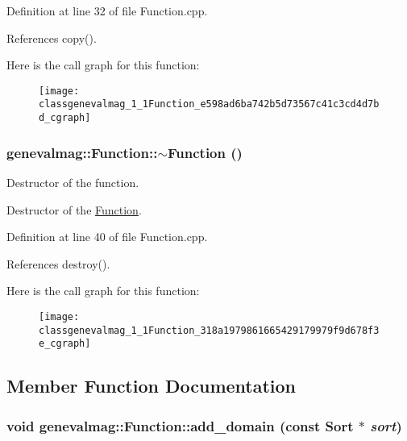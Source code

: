 Definition at line 32 of file Function.cpp.

References copy().

Here is the call graph for this function:\nopagebreak
\begin{figure}[H]
\begin{center}
\leavevmode
\texttt{[image: classgenevalmag\_1\_1Function\_e598ad6ba742b5d73567c41c3cd4d7bd\_cgraph]}
\end{center}
\end{figure}
\hypertarget{classgenevalmag_1_1Function_318a1979861665429179979f9d678f3e}{
\subsubsection[{$\sim$Function}]{\setlength{\rightskip}{0pt plus 5cm}genevalmag::Function::$\sim$Function ()}}
\label{classgenevalmag_1_1Function_318a1979861665429179979f9d678f3e}


Destructor of the function.

Destructor of the \hyperlink{classgenevalmag_1_1Function}{Function}. 

Definition at line 40 of file Function.cpp.

References destroy().

Here is the call graph for this function:\nopagebreak
\begin{figure}[H]
\begin{center}
\leavevmode
\texttt{[image: classgenevalmag\_1\_1Function\_318a1979861665429179979f9d678f3e\_cgraph]}
\end{center}
\end{figure}


\subsection{Member Function Documentation}
\hypertarget{classgenevalmag_1_1Function_283f269af558ded12c3dd51a7edb774a}{
\subsubsection[{add\_\-domain}]{\setlength{\rightskip}{0pt plus 5cm}void genevalmag::Function::add\_\-domain (const {\bf Sort} $\ast$ {\em sort})}}
\label{classgenevalmag_1_1Function_283f269af558ded12c3dd51a7edb774a}


